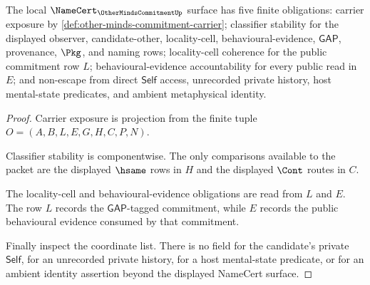 \begin{theorem}
\label{thm:other-minds-commitment-namecert-obligations}
The local $\NameCert_{\OtherMindsCommitmentUp}$ surface has five finite obligations: carrier exposure by \autoref{def:other-minds-commitment-carrier}; classifier stability for the displayed observer, candidate-other, locality-cell, behavioural-evidence, $\mathsf{GAP}$, provenance, $\Pkg$, and naming rows; locality-cell coherence for the public commitment row $L$; behavioural-evidence accountability for every public read in $E$; and non-escape from direct $\mathsf{Self}$ access, unrecorded private history, host mental-state predicates, and ambient metaphysical identity.
\end{theorem}
\begin{proof}
Carrier exposure is projection from the finite tuple $O=(A,B,L,E,G,H,C,P,N)$.

Classifier stability is componentwise. The only comparisons available to the packet are the displayed $\hsame$ rows in $H$ and the displayed $\Cont$ routes in $C$.

The locality-cell and behavioural-evidence obligations are read from $L$ and $E$. The row $L$ records the $\mathsf{GAP}$-tagged commitment, while $E$ records the public behavioural evidence consumed by that commitment.

Finally inspect the coordinate list. There is no field for the candidate's private $\mathsf{Self}$, for an unrecorded private history, for a host mental-state predicate, or for an ambient identity assertion beyond the displayed NameCert surface.
\end{proof}

